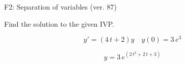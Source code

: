 \begin{exercise}
  \begin{exerciseTitle}F2: Separation of variables (ver. 87)\end{exerciseTitle}
  \begin{exerciseStatement}
    
Find the solution to the given IVP.

    
\[y'=( 4 \, t + 2 )y\hspace{1em} y(0)= 3 \, e^{3}\]

  \end{exerciseStatement}
  \begin{exerciseAnswer}
    
\[y= 3 \, e^{\left(2 \, t^{2} + 2 \, t + 3\right)}\]

  \end{exerciseAnswer}
\end{exercise}